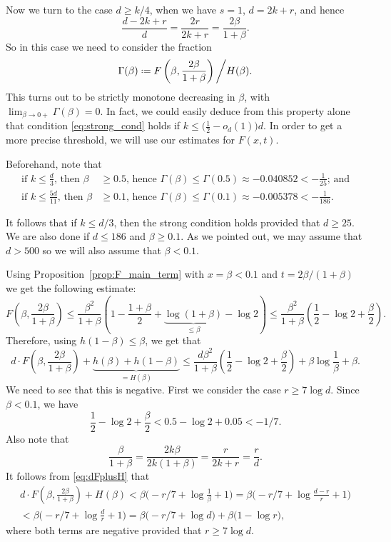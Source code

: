 \documentclass[12pt]{amsart}
\theoremstyle{definition}
\newcommand\be{\beta}
\newcommand\Ga{\Gamma}
\newcommand{\defeq}{\mathrel{\vcenter{\baselineskip0.5ex \lineskiplimit0pt
                     \hbox{\scriptsize.}\hbox{\scriptsize.}}}%
                     =}
\begin{document}
Now we turn to the case $d \geq k/4$, when we have $s=1$, $d=2k+r$, and hence 
%
\[ \frac{d-2k+r}{d} = \frac{2r}{2k+r} = \frac{2\be}{1+\be} .\]
%
So in this case we need to consider the fraction  
%
\[ \Ga(\be) \defeq 
F\left( \be, \frac{2\be}{1+\be} \right) \bigg/ H(\be) . \] 
%
This turns out to be strictly monotone decreasing in $\be$, with $\lim_{\be \to 0+} \Ga(\be) = 0$. In fact, we could easily deduce from this property alone that condition \eqref{eq:strong_cond} holds if $k \leq \big( \frac12 - o_d(1) \big) d$. In order to get a more precise threshold, we will use our estimates for $F(x,t)$.

Beforehand, note that 
%
\begin{align*}
\text{if } k \leq \frac{d}{3} \text{, then } 
\be &\geq 0.5 \text{, hence } 
\Ga(\be) \leq \Ga(0.5) \approx -0.040852 < -\frac{1}{25}
\text{; and} \\
\text{if } k \leq \frac{5d}{11}  \text{, then } 
\be & \geq 0.1 \text{, hence } 
\Ga(\be) \leq \Ga(0.1) \approx -0.005378 < -\frac{1}{186}
\text{.} 
\end{align*}
%

It follows that if $k \leq d/3$, then the strong condition holds provided that $d \geq 25$. We are also done if $d \leq 186$ and $\be \geq 0.1$. As we pointed out, we may assume that $d>500$ so we will also assume that $\be < 0.1$.

Using Proposition~\ref{prop:F_main_term} with $x=\be < 0.1$ and $t=2\be/(1+\be)$ we get the following estimate:
%
\begin{equation*}
F\left( \be, \frac{2\be}{1+\be} \right) \leq 
\frac{\be^2}{1+\be} \left( 1- \frac{1+\be}{2} + 
\underbrace{\log(1+\be)}_{\leq \be} 
- \log 2 \right) 
\leq \frac{\be^2}{1+\be} \left( 
\frac12 - \log 2 + \frac{\be}{2} \right) .
\end{equation*}
%
Therefore, using $h(1-\be) \leq \be$, we get that 
%
\begin{equation} \label{eq:dFplusH}
d \cdot F\left( \be, \frac{2\be}{1+\be} \right) + 
\underbrace{h(\be) + h(1-\be)}_{=H(\be)} 
\leq \frac{d\be^2}{1+\be} \left( \frac12 - \log 2 + \frac{\be}{2}  \right) + \be \log \frac{1}{\be} + \be .
\end{equation}
%
We need to see that this is negative. First we consider the case $r \geq 7 \log d$. Since $\be <0.1$, we have 
%
\[ \frac12 - \log 2 + \frac{\be}{2} 
< 0.5- \log 2 + 0.05 <-1/7 .\]
%
Also note that 
%
\[ \frac{\be}{1+\be} = \frac{2k \be}{2k(1+\be)} = 
\frac{r}{2k+r} = \frac{r}{d} .\]
%
It follows from \eqref{eq:dFplusH} that 
%
\begin{multline*}
d \cdot F\left( \be, \frac{2\be}{1+\be} \right) + H(\be) 
< \be\bigg( -r/7 + \log \frac{1}{\be} + 1 \bigg) 
= \be\bigg( -r/7 + \log \frac{d-r}{r} + 1 \bigg) \\
< \be\bigg( -r/7 + \log \frac{d}{r} + 1 \bigg) 
= \be \big( -r/7 + \log d \big) + \be\big( 1- \log r \big) ,
\end{multline*}
%
where both terms are negative provided that $r \geq 7 \log d$.
\end{document}
